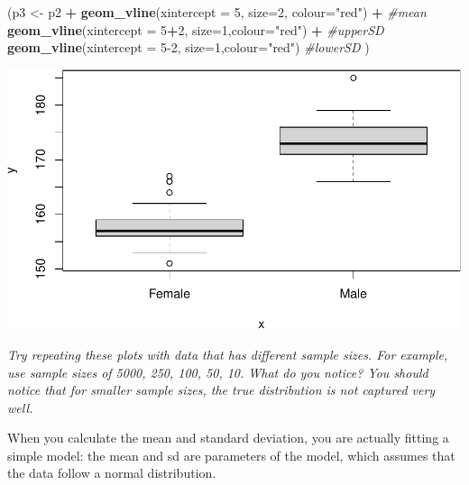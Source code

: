 \documentclass[
  a4paperpaper,
]{book}
\newenvironment{Shaded}{\begin{snugshade}}{\end{snugshade}}
\newcommand{\CommentTok}[1]{\textcolor[rgb]{0.56,0.35,0.01}{\textit{#1}}}
\newcommand{\DataTypeTok}[1]{\textcolor[rgb]{0.13,0.29,0.53}{#1}}
\newcommand{\DecValTok}[1]{\textcolor[rgb]{0.00,0.00,0.81}{#1}}
\newcommand{\KeywordTok}[1]{\textcolor[rgb]{0.13,0.29,0.53}{\textbf{#1}}}
\newcommand{\NormalTok}[1]{#1}
\newcommand{\OperatorTok}[1]{\textcolor[rgb]{0.81,0.36,0.00}{\textbf{#1}}}
\newcommand{\StringTok}[1]{\textcolor[rgb]{0.31,0.60,0.02}{#1}}
\begin{document}
\begin{Shaded}
\begin{Highlighting}[]
\NormalTok{(p3 \textless{}{-}}\StringTok{ }\NormalTok{p2 }\OperatorTok{+}\StringTok{ }
\StringTok{  }\KeywordTok{geom\_vline}\NormalTok{(}\DataTypeTok{xintercept =} \DecValTok{5}\NormalTok{, }\DataTypeTok{size=}\DecValTok{2}\NormalTok{, }\DataTypeTok{colour=}\StringTok{"red"}\NormalTok{) }\OperatorTok{+}\StringTok{ }\CommentTok{\#mean}
\StringTok{  }\KeywordTok{geom\_vline}\NormalTok{(}\DataTypeTok{xintercept =} \DecValTok{5}\OperatorTok{+}\DecValTok{2}\NormalTok{, }\DataTypeTok{size=}\DecValTok{1}\NormalTok{,}\DataTypeTok{colour=}\StringTok{"red"}\NormalTok{) }\OperatorTok{+}\StringTok{ }\CommentTok{\#upperSD}
\StringTok{  }\KeywordTok{geom\_vline}\NormalTok{(}\DataTypeTok{xintercept =} \DecValTok{5{-}2}\NormalTok{, }\DataTypeTok{size=}\DecValTok{1}\NormalTok{,}\DataTypeTok{colour=}\StringTok{"red"}\NormalTok{) }\CommentTok{\#lowerSD}
\NormalTok{ ) }
\end{Highlighting}
\end{Shaded}

\begin{center}\includegraphics{BB852_files/figure-latex/unnamed-chunk-97-1} \end{center}

\emph{Try repeating these plots with data that has different sample sizes. For example, use sample sizes of 5000, 250, 100, 50, 10. What do you notice? You should notice that for smaller sample sizes, the true distribution is not captured very well.}

When you calculate the mean and standard deviation, you are actually fitting a simple model: the mean and sd are parameters of the model, which assumes that the data follow a normal distribution.
\end{document}

